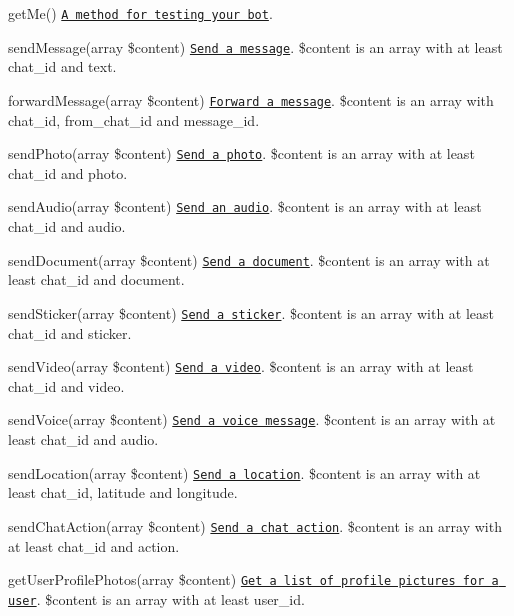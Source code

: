 \begin{DoxyItemize}
\item get\+Me() \href{https://core.telegram.org/bots/api#getme}{\tt A method for testing your bot}.
\item send\+Message(array \$content) \href{https://core.telegram.org/bots/api#sendmessage}{\tt Send a message}. \$content is an array with at least chat\+\_\+id and text.
\item forward\+Message(array \$content) \href{https://core.telegram.org/bots/api#forwardmessage}{\tt Forward a message}. \$content is an array with chat\+\_\+id, from\+\_\+chat\+\_\+id and message\+\_\+id.
\item send\+Photo(array \$content) \href{https://core.telegram.org/bots/api#sendphoto}{\tt Send a photo}. \$content is an array with at least chat\+\_\+id and photo.
\item send\+Audio(array \$content) \href{https://core.telegram.org/bots/api#sendaudio}{\tt Send an audio}. \$content is an array with at least chat\+\_\+id and audio.
\item send\+Document(array \$content) \href{https://core.telegram.org/bots/api#senddocument}{\tt Send a document}. \$content is an array with at least chat\+\_\+id and document.
\item send\+Sticker(array \$content) \href{https://core.telegram.org/bots/api#sendsticker}{\tt Send a sticker}. \$content is an array with at least chat\+\_\+id and sticker.
\item send\+Video(array \$content) \href{https://core.telegram.org/bots/api#sendvideo}{\tt Send a video}. \$content is an array with at least chat\+\_\+id and video.
\item send\+Voice(array \$content) \href{https://core.telegram.org/bots/api#sendvoice}{\tt Send a voice message}. \$content is an array with at least chat\+\_\+id and audio.
\item send\+Location(array \$content) \href{https://core.telegram.org/bots/api#sendlocation}{\tt Send a location}. \$content is an array with at least chat\+\_\+id, latitude and longitude.
\item send\+Chat\+Action(array \$content) \href{https://core.telegram.org/bots/api#sendchataction}{\tt Send a chat action}. \$content is an array with at least chat\+\_\+id and action.
\item get\+User\+Profile\+Photos(array \$content) \href{https://core.telegram.org/bots/api#getuserprofilephotos}{\tt Get a list of profile pictures for a user}. \$content is an array with at least user\+\_\+id.

\end{DoxyItemize}
